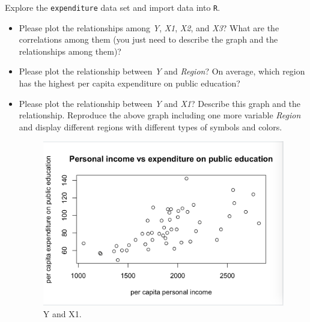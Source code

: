 \documentclass[12pt,letterpaper]{article}
\begin{document}
	\vspace{.5cm}
	\noindent Explore the \texttt{expenditure} data set and import data into \texttt{R}.
	\vspace{.5cm}
	  
	\vspace{.5cm}
	\begin{itemize}
		
		\item
		Please plot the relationships among \emph{Y}, \emph{X1}, \emph{X2}, and \emph{X3}? What are the correlations among them (you just need to describe the graph and the relationships among them)?
		\vspace{.5cm}
		
		 	
	
		\vspace{.5cm}
	
		\item
		Please plot the relationship between \emph{Y} and \emph{Region}? On average, which region has the highest per capita expenditure on public education?
		\vspace{.5cm}
		
		 	
		\vspace{.5cm}
	
		\item
		Please plot the relationship between \emph{Y} and \emph{X1}? Describe this graph and the relationship. Reproduce the above graph including one more variable \emph{Region} and display different regions with different types of symbols and colors.
		
			\vspace{.5cm}
			 	
			\vspace{.5cm}
			
		
		\begin{figure}
			\includegraphics[width=\linewidth]{YX1}
			\caption{Y and X1.}
			\label{fig:YX1}
			

\end{figure}
\end{itemize}
\end{document}
